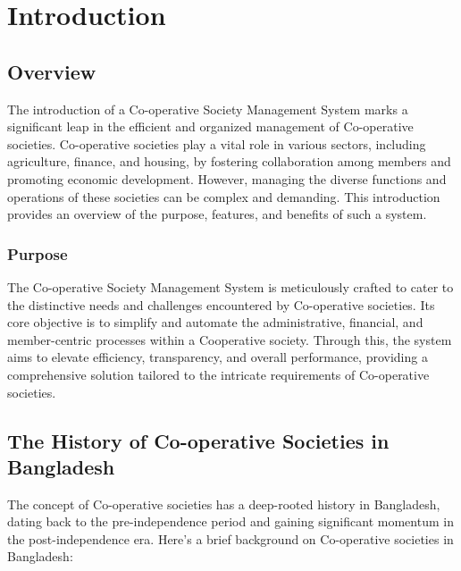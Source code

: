 

\chapter{Introduction}

\section{Overview}
The introduction of a Co-operative Society Management System marks a significant leap
in the efficient and organized management of Co-operative societies. Co-operative
societies play a vital role in various sectors, including agriculture, finance, and housing,
by fostering collaboration among members and promoting economic development.
However, managing the diverse functions and operations of these societies can be
complex and demanding. This introduction provides an overview of the purpose, features,
and benefits of such a system.

\subsection{Purpose}
The Co-operative Society Management System is meticulously crafted to cater to the distinctive needs and challenges encountered by Co-operative societies. Its core objective is to simplify and automate the administrative, financial, and member-centric processes within a Cooperative society. Through this, the system aims to elevate efficiency, transparency, and overall performance, providing a comprehensive solution tailored to the intricate requirements of Co-operative societies.





\section{The History of Co-operative Societies in Bangladesh}

The concept of Co-operative societies has a deep-rooted history in Bangladesh, dating back to the pre-independence period and gaining significant momentum in the post-independence era. Here's a brief background on Co-operative societies in Bangladesh:

